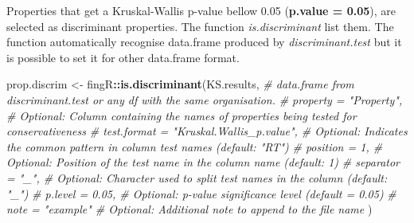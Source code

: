 \documentclass[
]{article}
\newenvironment{Shaded}{\begin{snugshade}}{\end{snugshade}}
\newcommand{\CommentTok}[1]{\textcolor[rgb]{0.56,0.35,0.01}{\textit{#1}}}
\newcommand{\FunctionTok}[1]{\textcolor[rgb]{0.13,0.29,0.53}{\textbf{#1}}}
\newcommand{\NormalTok}[1]{#1}
\newcommand{\OtherTok}[1]{\textcolor[rgb]{0.56,0.35,0.01}{#1}}
\newcommand{\SpecialCharTok}[1]{\textcolor[rgb]{0.81,0.36,0.00}{\textbf{#1}}}
\begin{document}
Properties that get a Kruskal-Wallis p-value bellow 0.05
(\textbf{p.value = 0.05}), are selected as discriminant properties. The
function \emph{is.discriminant} list them. The function automatically
recognise data.frame produced by \emph{discriminant.test} but it is
possible to set it for other data.frame format.

\begin{Shaded}
\begin{Highlighting}[]
\NormalTok{prop.discrim }\OtherTok{\textless{}{-}}\NormalTok{ fingR}\SpecialCharTok{::}\FunctionTok{is.discriminant}\NormalTok{(KS.results,                                }\CommentTok{\# data.frame from discriminant.test or any df with the same organisation.}
                                       \CommentTok{\# property = "Property",                   \# Optional: Column containing the names of properties being tested for conservativeness}
                                       \CommentTok{\# test.format = "Kruskal.Wallis\_p.value",  \# Optional: Indicates the common pattern in column test names (default: "RT")}
                                       \CommentTok{\# position = 1,                            \# Optional: Position of the test name in the column name (default: 1)}
                                       \CommentTok{\# separator = "\_",                         \# Optional: Character used to split test names in the column (default: "\_")}
                                       \CommentTok{\# p.level = 0.05,                          \# Optional: p{-}value significance level (default = 0.05)}
                                       \CommentTok{\# note = "example"                         \# Optional: Additional note to append to the file name}
\NormalTok{                                       )}
\end{Highlighting}
\end{Shaded}

\begin{Shaded}
\end{Shaded}
\end{document}
